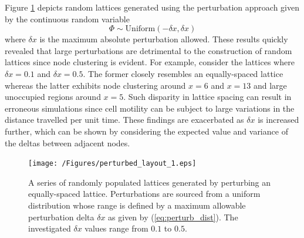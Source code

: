 \documentclass[11pt,titlepage,a4paper]{article}
\begin{document}
			Figure \ref{fig:perturbed_layout_1} depicts random lattices generated using the perturbation approach given by the continuous random variable
			\begin{equation}
				\label{eq:perturb_dist}
				\Phi \sim \text{Uniform}(-\delta x, \delta x)
			\end{equation}
			where $\delta x$ is the maximum absolute perturbation allowed. These results quickly revealed that large perturbations are detrimental to the construction of random lattices since node clustering is evident. For example, consider the lattices where $\delta x = 0.1$ and $\delta x = 0.5$. The former closely resembles an equally-spaced lattice whereas the latter exhibits node clustering around $x = 6$ and $x = 13$ and large unoccupied regions around $x = 5$. Such disparity in lattice spacing can result in erroneous simulations since cell motility can be subject to large variations in the distance travelled per unit time. These findings are exacerbated as $\delta x$ is increased further, which can be shown by considering the expected value and variance of the deltas between adjacent nodes.

			\begin{figure}[tbh]
				\centering
					\texttt{[image: /Figures/perturbed\_layout\_1.eps]}
				\caption{A series of randomly populated lattices generated by perturbing an equally-spaced lattice. Perturbations are sourced from a uniform distribution whose range is defined by a maximum allowable perturbation delta $\delta x$ as given by (\ref{eq:perturb_dist}). The investigated $\delta x$ values range from $0.1$ to $0.5$.}
				\label{fig:perturbed_layout_1}
			\end{figure}
\end{document}
